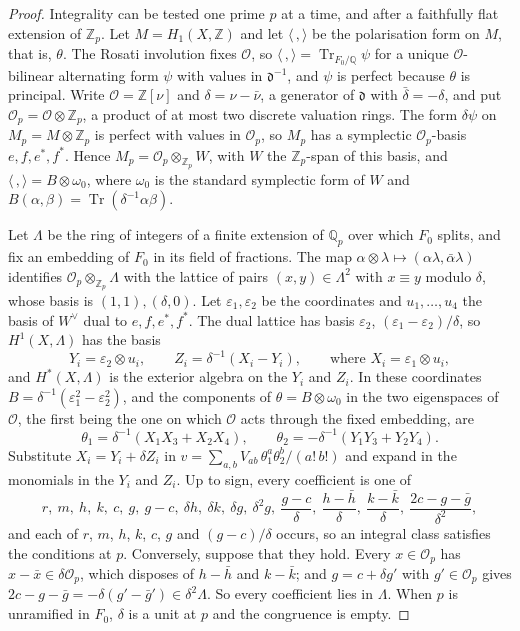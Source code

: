 \documentclass[11pt,reqno]{amsart}
\theoremstyle{plain}
\theoremstyle{definition}
\theoremstyle{remark}
\newcommand{\QQ}{\mathbb{Q}}
\newcommand{\ZZ}{\mathbb{Z}}
\newcommand{\cO}{\mathcal{O}}
\DeclareMathOperator{\Tr}{Tr}
\begin{document}
\begin{proof}
Integrality can be tested one prime $p$ at a time, and after a faithfully
flat extension of $\ZZ_{p}$. Let $M=H_{1}(X,\ZZ)$ and let $\langle\,,\rangle$
be the polarisation form on $M$, that is, $\theta$. The Rosati involution fixes
$\cO$, so $\langle\,,\rangle=\Tr_{F_{0}/\QQ}\psi$ for a unique $\cO$-bilinear
alternating form $\psi$ with values in $\mathfrak d^{-1}$, and $\psi$ is
perfect because $\theta$ is principal. Write $\cO=\ZZ[\nu]$ and
$\delta=\nu-\bar\nu$, a generator of $\mathfrak d$
with $\bar\delta=-\delta$, and put $\cO_{p}=\cO\otimes\ZZ_{p}$, a product of
at most two discrete valuation rings. The form $\delta\psi$ on
$M_{p}=M\otimes\ZZ_{p}$ is perfect with values in $\cO_{p}$, so $M_{p}$ has a
symplectic $\cO_{p}$-basis $e,f,e^{*},f^{*}$. Hence
$M_{p}=\cO_{p}\otimes_{\ZZ_{p}}W$, with $W$ the $\ZZ_{p}$-span of this basis,
and $\langle\,,\rangle=B\otimes\omega_{0}$, where $\omega_{0}$ is the standard
symplectic form of $W$ and $B(\alpha,\beta)=\Tr(\delta^{-1}\alpha\beta)$.

Let $\Lambda$ be the ring of integers of a finite extension of $\QQ_{p}$ over
which $F_{0}$ splits, and fix an embedding of $F_{0}$ in its field of
fractions. The map $\alpha\otimes\lambda\mapsto(\alpha\lambda,\bar\alpha\lambda)$
identifies $\cO_{p}\otimes_{\ZZ_{p}}\Lambda$ with the lattice of pairs
$(x,y)\in\Lambda^{2}$ with $x\equiv y$ modulo $\delta$, whose basis is
$(1,1),(\delta,0)$. Let $\varepsilon_{1},\varepsilon_{2}$ be the coordinates
and $u_{1},\dots,u_{4}$ the basis of $W^{\vee}$ dual to $e,f,e^{*},f^{*}$. The
dual lattice has basis $\varepsilon_{2}$, $(\varepsilon_{1}-\varepsilon_{2})/\delta$,
so $H^{1}(X,\Lambda)$ has the basis
\[
  Y_{i}=\varepsilon_{2}\otimes u_{i},\qquad
  Z_{i}=\delta^{-1}(X_{i}-Y_{i}),\qquad\text{where }X_{i}=\varepsilon_{1}\otimes u_{i},
\]
and $H^{*}(X,\Lambda)$ is the exterior algebra on the $Y_{i}$ and $Z_{i}$. In
these coordinates $B=\delta^{-1}(\varepsilon_{1}^{2}-\varepsilon_{2}^{2})$, and the
components of $\theta=B\otimes\omega_{0}$ in the two eigenspaces of $\cO$, the
first being the one on which $\cO$ acts through the fixed embedding, are
\[
  \theta_{1}=\delta^{-1}(X_{1}X_{3}+X_{2}X_{4}),\qquad
  \theta_{2}=-\delta^{-1}(Y_{1}Y_{3}+Y_{2}Y_{4}).
\]
Substitute $X_{i}=Y_{i}+\delta Z_{i}$ in $v=\sum_{a,b}V_{ab}\,\theta_{1}^{a}
\theta_{2}^{b}/(a!\,b!)$ and expand in the monomials in the $Y_{i}$ and $Z_{i}$.
Up to sign, every coefficient is one of
\[
  r,\ m,\ h,\ k,\ c,\ g,\ g-c,\ \delta h,\ \delta k,\ \delta g,\ \delta^{2}g,\
  \frac{g-c}{\delta},\ \frac{h-\bar h}{\delta},\ \frac{k-\bar k}{\delta},\
  \frac{2c-g-\bar g}{\delta^{2}},
\]
and each of $r$, $m$, $h$, $k$, $c$, $g$ and $(g-c)/\delta$ occurs, so an
integral class satisfies the conditions at $p$. Conversely, suppose that they
hold. Every $x\in\cO_{p}$ has $x-\bar x\in\delta\cO_{p}$, which disposes of
$h-\bar h$ and $k-\bar k$; and $g=c+\delta g'$ with $g'\in\cO_{p}$ gives
$2c-g-\bar g=-\delta(g'-\bar g')\in\delta^{2}\Lambda$. So every coefficient
lies in $\Lambda$. When $p$ is unramified in $F_{0}$, $\delta$ is a unit at
$p$ and the congruence is empty.
\end{proof}
\end{document}
